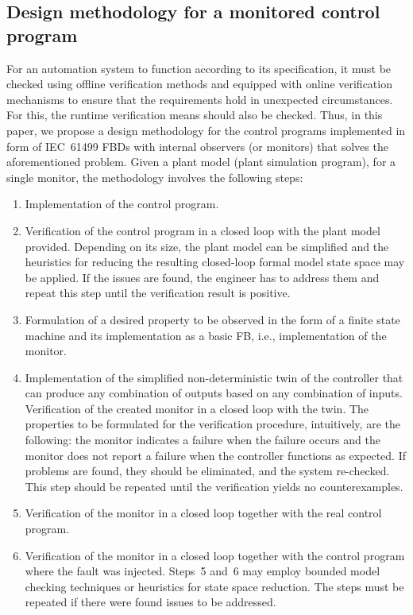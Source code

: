 \begin{bibunit}
\section{Design methodology for a monitored control program}
\label{sec:method}

For an automation system to function according to its specification, it must be checked using offline verification methods and equipped with online verification mechanisms to ensure that the requirements hold in unexpected circumstances. For this, the runtime verification means should also be checked.
Thus, in this paper, we propose a design methodology for the control programs implemented in form of IEC~61499 FBDs with internal observers (or monitors) that solves the aforementioned problem. Given a plant model (plant simulation program), for a single monitor, the methodology involves the following steps:
\begin{enumerate}
    \item Implementation of the control program.
    \item Verification of the control program in a closed loop with the plant model provided. Depending on its size, the plant model can be simplified and the heuristics for reducing the resulting closed-loop formal model state space may be applied. If the issues are found, the engineer has to address them and repeat this step until the verification result is positive.
    \item Formulation of a desired property to be observed in the form of a finite state machine and its implementation as a basic FB, i.e., implementation of the monitor.
    \item Implementation of the simplified non-deterministic twin of the controller that can produce any combination of outputs based on any combination of inputs. Verification of the created monitor in a closed loop with the twin. The properties to be formulated for the verification procedure, intuitively, are the following: the monitor indicates a failure when the failure occurs and the monitor does not report a failure when the controller functions as expected. If problems are found, they should be eliminated, and the system re-checked. This step should be repeated until the verification yields no counterexamples.
    \item Verification of the monitor in a closed loop together with the real control program.
    \item Verification of the monitor in a closed loop together with the control program where the fault was injected. Steps~5 and~6 may employ bounded model checking techniques or heuristics for state space reduction. The steps must be repeated if there were found issues to be addressed.
\end{enumerate}


\end{bibunit}
